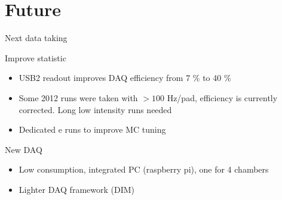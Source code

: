 \documentclass[10pt]{beamer}
\begin{document}
\section{Future}

\begin{frame}{Next data taking}
\begin{block}{Improve statistic}
\begin{itemize}
\item USB2 readout improves DAQ efficiency from 7 \% to 40 \%
\item Some 2012 runs were taken with $> 100$ Hz/pad, efficiency is currently corrected. Long low intensity runs needed 
\item Dedicated e runs to improve MC tuning 
\end{itemize}
\end{block}
\pause
\begin{block}{ New DAQ}
\begin{itemize}
\item Low consumption, integrated PC (raspberry pi), one for 4 chambers
\item Lighter DAQ framework (DIM)
\end{itemize}

\end{block}
\end{frame}
\end{document}
